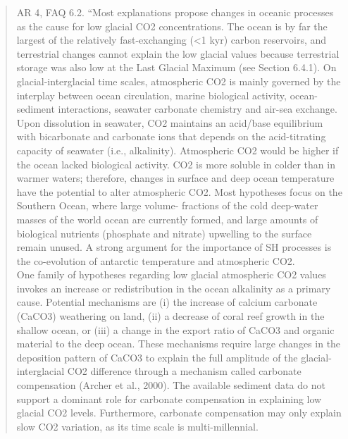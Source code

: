 \documentclass[amstex,12pt]{book}
\begin{document}
\begin{quotation}
	AR 4, FAQ 6.2.  “Most explanations propose changes in oceanic processes as the cause for low glacial CO2 concentrations. The ocean is by far the largest of the relatively fast-exchanging (<1 kyr) carbon reservoirs, and terrestrial changes cannot explain the low glacial values because terrestrial storage was also low at the Last Glacial Maximum (see Section 6.4.1). On glacial-interglacial time scales, atmospheric CO2 is mainly governed by the interplay between ocean circulation, marine biological activity, ocean-sediment interactions, seawater carbonate chemistry and air-sea exchange. Upon dissolution in seawater, CO2 maintains an acid/base equilibrium with bicarbonate and carbonate ions that depends on the acid-titrating capacity of seawater (i.e., alkalinity). Atmospheric CO2 would be higher if the ocean lacked biological activity. CO2 is more soluble in colder than in warmer waters; therefore, changes in surface and deep ocean temperature have the potential to alter atmospheric CO2. Most hypotheses focus on the Southern Ocean, where large volume- fractions of the cold deep-water masses of the world ocean are currently formed, and large amounts of biological nutrients (phosphate and nitrate) upwelling to the surface remain unused. A strong argument for the importance of SH processes is the co-evolution of antarctic temperature and atmospheric CO2.\\
	One family of hypotheses regarding low glacial atmospheric CO2 values invokes an increase or redistribution in the ocean alkalinity as a primary cause. Potential mechanisms are (i) the increase of calcium carbonate (CaCO3) weathering on land, (ii) a decrease of coral reef growth in the shallow ocean, or (iii) a change in the export ratio of CaCO3 and organic material to the deep ocean. These mechanisms require large changes in the deposition pattern of CaCO3 to explain the full amplitude of the glacial-interglacial CO2 difference through a mechanism called carbonate compensation (Archer et al., 2000). The available sediment data do not support a dominant role for carbonate compensation in explaining low glacial CO2 levels. Furthermore, carbonate compensation may only explain slow CO2 variation, as its time scale is multi-millennial.\\

\end{quotation}
\end{document}
